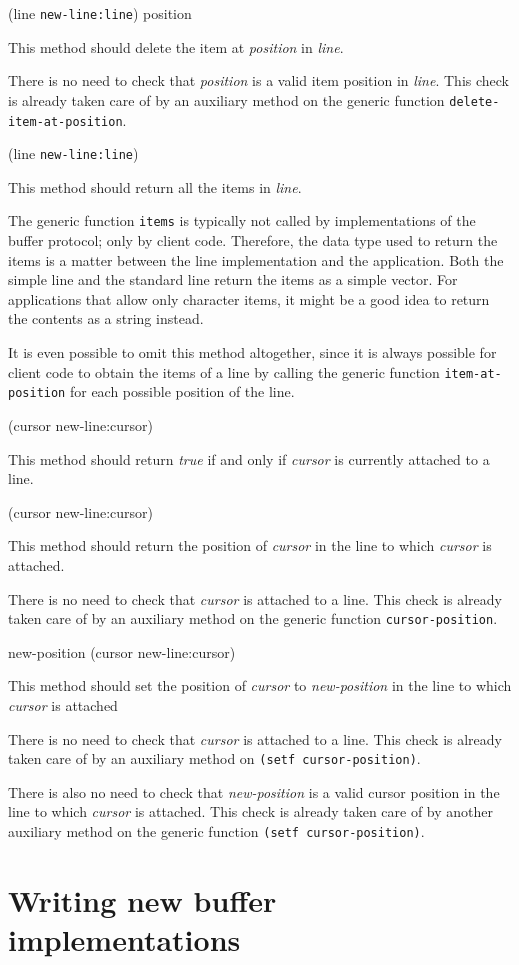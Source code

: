  {(line \texttt{new-line:line}) position}

This method should delete the item at \textit{position} in \textit{line}.

There is no need to check that \textit{position} is a valid item
position in \textit{line}.  This check is already taken care of by an
auxiliary method on the generic function
\texttt{delete-item-at-position}.

 {(line \texttt{new-line:line})}

This method should return all the items in \textit{line}.

The generic function \texttt{items} is typically not called by
implementations of the buffer protocol; only by client code.
Therefore, the data type used to return the items is a matter between
the line implementation and the application.  Both the simple line
 and the standard line
 return the items as a simple
vector.  For applications that allow only character items, it might be
a good idea to return the contents as a string instead.

It is even possible to omit this method altogether, since it is always
possible for client code to obtain the items of a line by calling the
generic function \texttt{item-at-position} for each possible position
of the line.

 {(cursor new-line:cursor)}

This method should return \emph{true} if and only if \textit{cursor}
is currently attached to a line.


 {(cursor new-line:cursor)}

This method should return the position of \textit{cursor} in the line
to which \textit{cursor} is attached.

There is no need to check that \textit{cursor} is attached to a line.
This check is already taken care of by an auxiliary method on the
generic function \texttt{cursor-position}.

 {new-position (cursor new-line:cursor)}

This method should set the position of \textit{cursor} to
\textit{new-position} in the line to which \textit{cursor} is attached

There is no need to check that \textit{cursor} is attached to a line.
This check is already taken care of by an auxiliary method on
\texttt{(setf cursor-position)}.

There is also no need to check that \textit{new-position} is a valid
cursor position in the line to which \textit{cursor} is attached.
This check is already taken care of by another auxiliary method on the
generic function \texttt{(setf cursor-position)}.

\section{Writing new buffer implementations}

